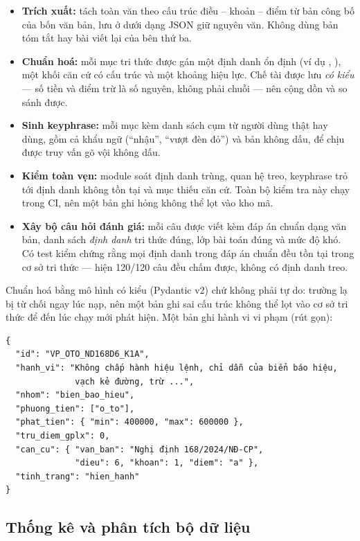 \begin{itemize}
  \item \textbf{Trích xuất:} tách toàn văn theo cấu trúc điều -- khoản -- điểm từ bản công bố
        của bốn văn bản, lưu ở  dưới dạng JSON giữ nguyên văn. Không dùng bản
        tóm tắt hay bài viết lại của bên thứ ba.
  \item \textbf{Chuẩn hoá:} mỗi mục tri thức được gán một định danh ổn định (ví dụ
        , ), một khối căn cứ có cấu trúc và một khoảng
        hiệu lực. Chế tài được lưu \emph{có kiểu} --- số tiền và điểm trừ là số nguyên, không
        phải chuỗi --- nên cộng dồn và so sánh được.
  \item \textbf{Sinh keyphrase:} mỗi mục kèm danh sách cụm từ người dùng thật hay dùng, gồm
        cả khẩu ngữ (``nhậu'', ``vượt đèn đỏ'') và bản không dấu, để chịu được truy vấn gõ vội
        không dấu.
  \item \textbf{Kiểm toàn vẹn:} module  soát định danh trùng, quan hệ
        treo, keyphrase trỏ tới định danh không tồn tại và mục thiếu căn cứ. Toàn bộ kiểm tra
        này chạy trong CI, nên một bản ghi hỏng không thể lọt vào kho mã.
  \item \textbf{Xây bộ câu hỏi đánh giá:} mỗi câu được viết kèm đáp án chuẩn dạng văn bản,
        danh sách \emph{định danh} tri thức đúng, lớp bài toán đúng và mức độ khó. Có test kiểm
        chứng rằng mọi định danh trong đáp án chuẩn đều tồn tại trong cơ sở tri thức --- hiện
        120/120 câu đều chấm được, không có định danh treo.
\end{itemize}

Chuẩn hoá bằng mô hình có kiểu (Pydantic v2) chứ không phải  tự do: trường lạ bị
từ chối ngay lúc nạp, nên một bản ghi sai cấu trúc không thể lọt vào cơ sở tri thức để đến
lúc chạy mới phát hiện. Một bản ghi hành vi vi phạm (rút gọn):

\begin{lstlisting}
{
  "id": "VP_OTO_ND168D6_K1A",
  "hanh_vi": "Không chấp hành hiệu lệnh, chỉ dẫn của biển báo hiệu,
              vạch kẻ đường, trừ ...",
  "nhom": "bien_bao_hieu",
  "phuong_tien": ["o_to"],
  "phat_tien": { "min": 400000, "max": 600000 },
  "tru_diem_gplx": 0,
  "can_cu": { "van_ban": "Nghị định 168/2024/NĐ-CP",
              "dieu": 6, "khoan": 1, "diem": "a" },
  "tinh_trang": "hien_hanh"
}
\end{lstlisting}

\subsection{Thống kê và phân tích bộ dữ liệu}

